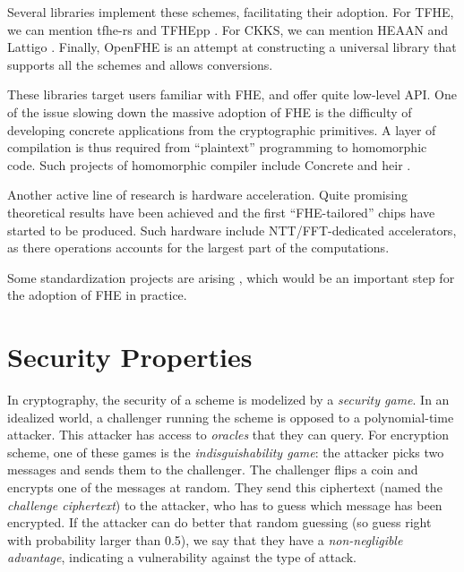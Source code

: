 

Several libraries implement these schemes, facilitating their adoption. For TFHE, we can mention tfhe-rs \cite{tfhe-rs}  and TFHEpp \cite{TFHEpp}. For CKKS, we can mention HEAAN \cite{heean} and Lattigo \cite{lattigo}. Finally, OpenFHE \cite{openfhe} is an attempt at constructing a universal library that supports all the schemes and allows conversions.


These libraries target users familiar with FHE, and offer quite low-level API. One of the issue slowing down the massive adoption of FHE is the difficulty of developing concrete applications from the cryptographic primitives. A layer of compilation is thus required from ``plaintext'' programming to homomorphic code. Such projects of homomorphic compiler include Concrete \cite{Concrete} and heir \cite{HEIR}.


Another active line of research is hardware acceleration. Quite promising theoretical results have been achieved \cite{TCHES:GVPHMS23, EPRINT:BBTV23a, EPRINT:CPBFSJ23, EPRINT:KHMR24} and the first ``FHE-tailored'' chips have started to be produced. Such hardware include NTT/FFT-dedicated accelerators, as there operations accounts for the largest part of the computations. 


Some standardization projects are arising \cite{HomomorphicEncryptionSecurityStandard, call_nist}, which would be an important step for the adoption of FHE in practice.
 	


\section{Security Properties}



In cryptography, the security of a scheme is modelized by a \textit{security game}. In an idealized world, a challenger running the scheme is opposed to a polynomial-time attacker. This attacker has access to \textit{oracles} that they can query. For encryption scheme, one of these games is the \textit{indisguishability game}: the attacker picks two messages and sends them to the challenger. The challenger flips a coin and encrypts one of the messages at random. They send this ciphertext (named the \textit{challenge ciphertext}) to the attacker, who has to guess which message has been encrypted. If the attacker can do better that random guessing (so guess right with probability larger than 0.5), we say that they have a \textit{non-negligible advantage}, indicating a vulnerability against the type of attack.

